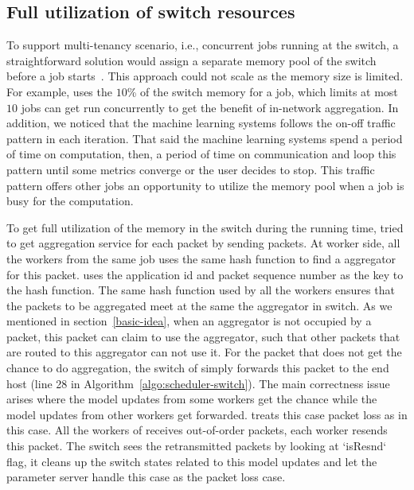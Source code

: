 \subsection{Full utilization of switch resources}
To support multi-tenancy scenario, i.e., concurrent \system jobs running at the switch, 
a straightforward solution would assign a separate memory pool of the switch before a job starts~\cite{switchml}.
This approach could not scale as the memory size is limited. For example, \switchml 
uses the $10$\% of the switch memory for a job, which limits at most $10$ jobs can get run concurrently to get 
the benefit of in-network aggregation. In addition, we noticed that the machine learning systems
follows the on-off traffic pattern in each iteration. 
That said the machine learning 
systems spend a period of time on computation, then, a period of time on communication
and loop this pattern until some metrics converge or the user decides to stop. 
This traffic pattern offers other jobs an opportunity to utilize the memory pool 
when a job is busy for the computation.

To get full utilization of the memory in the switch during the running time, 
\system tried to get aggregation service for each packet by sending \system packets.
At worker side, all the workers from the same job uses the same hash function 
to find a aggregator for this packet. 
\system uses the application id and packet sequence number as the key to the hash function.
The same hash function used by all the workers ensures that 
the packets to be aggregated meet at the same the aggregator in switch. 
As we mentioned in section~\ref{basic-idea}, when an aggregator is not occupied by 
a \system packet, this packet can claim to use the aggregator, such that other packets that are routed
to this aggregator can not use it.
For the packet that does not get the chance to do aggregation, 
the switch of \system simply forwards this packet to the end host (line 28 in Algorithm~\ref{algo:scheduler-switch}).
The main correctness issue arises where the model updates from some workers get the chance while the model updates from
other workers get forwarded. \system treats this case packet loss as in this case.
All the workers of \system receives out-of-order packets, each worker resends this packet.
The switch sees the retransmitted packets by looking at `isResnd` flag, it cleans up the switch states
related to this model updates and let the parameter server handle this case as the packet loss case.

